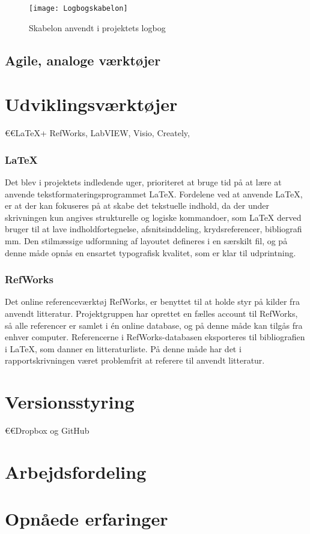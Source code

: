	\begin{figure}[htb]
	\centering
	\texttt{[image: Logbogskabelon]}
	\caption{Skabelon anvendt i projektets logbog}
	\label{fig:logbog}	
	\end{figure}
	
	\subsection{Agile, analoge værktøjer}
	

\section{Udviklingsværktøjer}
	€€LaTeX+ RefWorks, LabVIEW, Visio, Creately, 

	\subsubsection{\LaTeX}
Det blev i projektets indledende uger, prioriteret at bruge tid på at lære at anvende tekstformateringsprogrammet \LaTeX. Fordelene ved at anvende LaTeX, er at der kan fokuseres på at skabe det tekstuelle indhold, da der under skrivningen kun angives strukturelle og logiske kommandoer, som LaTeX derved bruger til at lave indholdfortegnelse, afsnitsinddeling, krydsreferencer, bibliografi mm. Den stilmæssige udformning af layoutet defineres i en særskilt fil, og på denne måde opnås en ensartet typografisk kvalitet, som er klar til udprintning.   
	\subsubsection{RefWorks}
Det online referenceværktøj RefWorks, er benyttet til at holde styr på kilder fra anvendt litteratur. Projektgruppen har oprettet en fælles account til RefWorks, så alle referencer er samlet i én online database, og på denne måde kan tilgås fra enhver computer. Referencerne i RefWorks-databasen eksporteres til bibliografien i LaTeX, som danner en litteraturliste. På denne måde har det i rapportskrivningen været problemfrit at referere til anvendt litteratur.  
	
	



\section{Versionsstyring}
 	€€Dropbox og GitHub

\section{Arbejdsfordeling}

\section{Opnåede erfaringer}
 